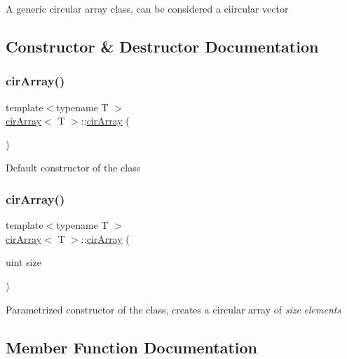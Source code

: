 A generic circular array class, can be considered a ciircular vector 

\subsection{Constructor \& Destructor Documentation}
\mbox{\label{classcirArray_a4ff569017124082def843f2c36725075}} 
\subsubsection{\texorpdfstring{cir\+Array()}{cirArray()}\hspace{0.1cm}{\footnotesize\ttfamily [1/2]}}
{\footnotesize\ttfamily template$<$typename T $>$ \\
\mbox{\hyperlink{classcirArray}{cir\+Array}}$<$ T $>$\+::\mbox{\hyperlink{classcirArray}{cir\+Array}} (\begin{DoxyParamCaption}{ }\end{DoxyParamCaption})}

Default constructor of the class \mbox{\label{classcirArray_a2241cbe0754475c1ebc4a095cedaecdd}} 
\subsubsection{\texorpdfstring{cir\+Array()}{cirArray()}\hspace{0.1cm}{\footnotesize\ttfamily [2/2]}}
{\footnotesize\ttfamily template$<$typename T $>$ \\
\mbox{\hyperlink{classcirArray}{cir\+Array}}$<$ T $>$\+::\mbox{\hyperlink{classcirArray}{cir\+Array}} (\begin{DoxyParamCaption}\item[{uint}]{size }\end{DoxyParamCaption})}

Parametrized constructor of the class, creates a circular array of {\itshape size} {\itshape elements} 

\subsection{Member Function Documentation}
\mbox{\label{classcirArray_a6c8bd228590d2a4a577bdf3fe78cf58d}} 
